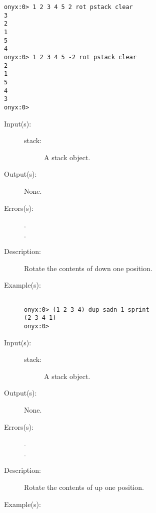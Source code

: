 \begin{description}
\begin{description}
\begin{verbatim}
onyx:0> 1 2 3 4 5 2 rot pstack clear
3
2
1
5
4
onyx:0> 1 2 3 4 5 -2 rot pstack clear
2
1
5
4
3
onyx:0>
		\end{verbatim}
	\end{description}
\label{systemdict:sadn}
\item[{\onyxop{stack}{sadn}{--}}: ]
	\begin{description}\item[]
	\item[Input(s): ]
		\begin{description}\item[]
		\item[stack: ]
			A stack object.
		\end{description}
	\item[Output(s): ] None.
	\item[Errors(s): ]
		\begin{description}\item[]
		\item[.]
		\item[.]
		\end{description}
	\item[Description: ]
		Rotate the contents of  down one position.
	\item[Example(s): ]\begin{verbatim}

onyx:0> (1 2 3 4) dup sadn 1 sprint
(2 3 4 1)
onyx:0>
		\end{verbatim}
	\end{description}
\label{systemdict:saup}
\item[{\onyxop{stack}{saup}{--}}: ]
	\begin{description}\item[]
	\item[Input(s): ]
		\begin{description}\item[]
		\item[stack: ]
			A stack object.
		\end{description}
	\item[Output(s): ] None.
	\item[Errors(s): ]
		\begin{description}\item[]
		\item[.]
		\item[.]
		\end{description}
	\item[Description: ]
		Rotate the contents of  up one position.
	\item[Example(s): ]\begin{verbatim}


\end{verbatim}
\end{description}
\end{description}
